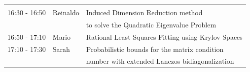 \documentclass{beamer}
\begin{document}
\begin{frame}
\begin{table}[h]
\begin{tabular}{lll}
\hline \\ [-1.5ex]
{\color{red}16:30} - 16:50 & Reinaldo & Induced Dimension Reduction method \\
            & & to solve the Quadratic Eigenvalue Problem \\ [0.5ex]
16:50 - 17:10 & Mario & Rational Least Squares Fitting using Krylov Spaces\\ [0.5ex]
17:10 - 17:30 & Sarah & Probabilistic bounds for the matrix condition  \\
                    & & number with extended Lanczos bidiagonalization\\ [0.5ex]
\end{tabular}
\end{table}
\end{frame}
\end{document}
